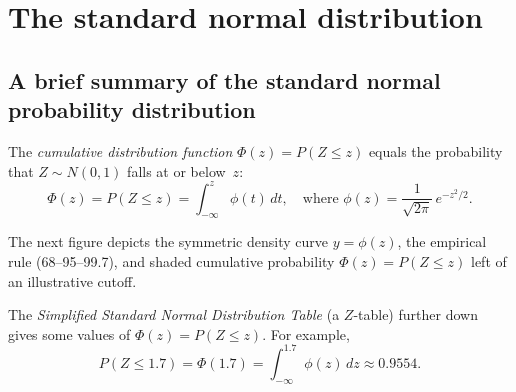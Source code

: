 \section{The standard normal distribution}
\subsection*{A brief summary of the standard normal probability distribution}

\noindent
The \textit{cumulative distribution function} $\Phi(z)=P(Z\le z)$ equals the probability that $Z\sim N(0,1)$ falls at or below~$z$:
\[
    \Phi(z) = P(Z \le z) = \int_{-\infty}^z \phi(t) \, dt,
    \quad \text{where }\phi(z)=\frac{1}{\sqrt{2\pi}}\, e^{-z^{2}/2}.
\]

\vspace{0.45cm}
\noindent
The next figure depicts the symmetric density curve $y=\phi(z)$, the empirical rule (68--95--99.7), and shaded cumulative probability $\Phi(z)=P(Z\le z)$ left of an illustrative cutoff.

\noindent
The \textit{Simplified Standard Normal Distribution Table} (a $Z$-table) further down gives some values of $\Phi(z) = P(Z \le z)$. For example,
\[
    P(Z \le 1.7) = \Phi(1.7) = \int_{-\infty}^{1.7} \phi(z) \, dz \approx 0.9554.
\]

